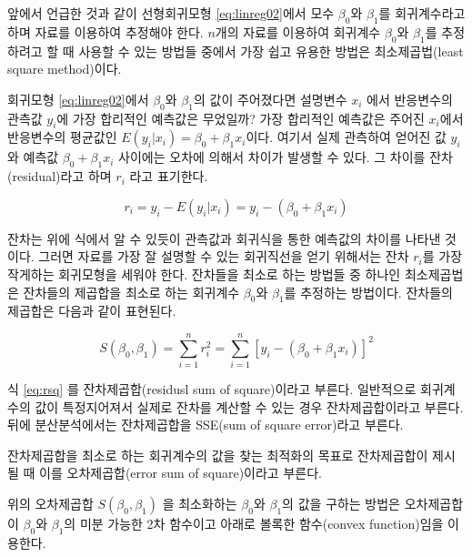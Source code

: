 \documentclass[
]{book}
\makeatletter
\newenvironment{kframe}{%
\medskip{}
\setlength{\fboxsep}{.8em}
 \def\at@end@of@kframe{}%
 \ifinner\ifhmode%
  \def\at@end@of@kframe{\end{minipage}}%
  \begin{minipage}{\columnwidth}%
 \fi\fi%
 \def\FrameCommand##1{\hskip\@totalleftmargin \hskip-\fboxsep
 \colorbox{shadecolor}{##1}\hskip-\fboxsep
     \hskip-\linewidth \hskip-\@totalleftmargin \hskip\columnwidth}%
 \MakeFramed {\advance\hsize-\width
   \@totalleftmargin\z@ \linewidth\hsize
   \@setminipage}}%
 {\par\unskip\endMakeFramed%
 \at@end@of@kframe}
\newenvironment{rmdblock}[1]
  {
  \begin{itemize}
  \renewcommand{\labelitemi}{
    \raisebox{-.7\height}[0pt][0pt]{
      {\setkeys{Gin}{width=3em,keepaspectratio}\texttt{[image: images/\#1]}}
    }
  }
  \setlength{\fboxsep}{1em}
  \begin{kframe}
  \item
  }
  {
  \end{kframe}
  \end{itemize}
  }
\newenvironment{rmdnote}
  {\begin{rmdblock}{note}}
  {\end{rmdblock}}
\theoremstyle{definition}
\theoremstyle{definition}
\theoremstyle{definition}
\theoremstyle{definition}
\theoremstyle{remark}
\makeatother
\begin{document}
앞에서 언급한 것과 같이 선형회귀모형 \eqref{eq:linreg02}에서 모수
\(\beta_0\)와 \(\beta_1\)를 회귀계수라고 하며 자료를 이용하여 추정해야 한다.
\(n\)개의 자료를 이용하여 회귀계수 \(\beta_0\)와 \(\beta_1\)를 추정하려고 할
때 사용할 수 있는 방법들 중에서 가장 쉽고 유용한 방법은 최소제곱법(least
square method)이다.

회귀모형 \eqref{eq:linreg02}에서 \(\beta_0\)와 \(\beta_1\)의 값이 주어졌다면
설명변수 \(x_i\) 에서 반응변수의 관측값 \(y_i\)에 가장 합리적인 예측값은
무었일까? 가장 합리적인 예측값은 주어진 \(x_i\)에서 반응변수의 평균값인
\(E(y_i | x_i)=\beta_0 + \beta_1 x_i\)이다. 여기서 실제 관측하여 얻어진 값
\(y_i\)와 예측값 \(\beta_0 + \beta_1 x_i\) 사이에는 오차에 의해서 차이가
발생할 수 있다. 그 차이를 잔차(residual)라고 하며 \(r_i\) 라고 표기한다.

\[  r_i = y_i - E(y_i|x_i) = y_i - (  \beta_0 +  \beta_1 x_i) \]

잔차는 위에 식에서 알 수 있듯이 관측값과 회귀식을 통한 예측값의 차이를
나타낸 것이다. 그러면 자료를 가장 잘 설명할 수 있는 회귀직선을 얻기
위해서는 잔차 \(r_i\)를 가장 작게하는 회귀모형을 세워야 한다. 잔차들을
최소로 하는 방법들 중 하나인 최소제곱법은 잔차들의 제곱합을 최소로 하는
회귀계수 \(\beta_0\)와 \(\beta_1\)를 추정하는 방법이다. 잔차들의 제곱합은
다음과 같이 표현된다.

\begin{equation} 
 S(\beta_0 , \beta_1) = \sum^n_{i=1}r^2_i = \sum^n_{i=1}[y_i-(\beta_0 + \beta_1 x_i)]^2 
 \label{eq:rsq}
 \end{equation}

\begin{rmdnote}
식 \eqref{eq:rsq} 를 잔차제곱합(residusl sum of square)이라고 부른다. 일반적으로 회귀계수의 값이 특정지어져서 실제로 잔차를 계산할 수 있는 경우 잔차제곱합이라고 부른다. 뒤에 분산분석에서는 잔차제곱합을 SSE(sum of square error)라고 부른다.

잔차제곱합을 최소로 하는 회귀계수의 값을 찾는 최적화의 목표로 잔차제곱합이 제시될 때 이를 오차제곱합(error sum of square)이라고 부른다.
\end{rmdnote}

위의 오차제곱합 \(S(\beta_0 , \beta_1)\) 을 최소화하는 \(\beta_0\)와
\(\beta_1\)의 값을 구하는 방법은 오차제곱합이 \(\beta_0\)와 \(\beta_1\)의 미분
가능한 2차 함수이고 아래로 볼록한 함수(convex function)임을 이용한다.
\end{document}
